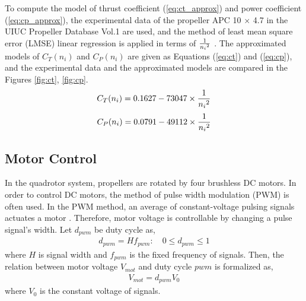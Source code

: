 To compute the model of thrust coefficient (\ref{eq:ct_approx}) and power coefficient (\ref{eq:cp_approx}), the experimental data of the propeller APC 10 \(\times\) 4.7 in the UIUC Propeller Database Vol.1 are used, and the method of least mean square error (LMSE) linear regression is applied in terms of \(1 \over {{n_i}^2}\) \cite{airfoil}. The approximated models of \(C_T (n_i)\) and \(C_P (n_i)\) are given as Equations (\ref{eq:ct}) and (\ref{eq:cp}), and the experimental data and the approximated models are compared in the Figures \ref{fig:ct}, \ref{fig:cp}. \\
\begin{equation}
\label{eq:ct}
\begin{aligned}
C_T ({n_i}) & = 0.1627 -73047 \times {1 \over {n_i}^2} \\
\end{aligned}
\end{equation}
\begin{equation}
\label{eq:cp}
\begin{aligned}
C_P ({n_i}) & = 0.0791 - 49112 \times {1 \over {n_i}^2} \\
\end{aligned}
\end{equation}
\subsection{Motor Control}
In the quadrotor system, propellers are rotated by four brushless DC motors. In order to control DC motors, the method of pulse width modulation (PWM) is often used. In the PWM method, an average of constant-voltage pulsing signals actuates a motor \cite{audio}. Therefore, motor voltage is controllable by changing a pulse signal's width. Let \(d_{pwm}\) be duty cycle as, \\
\begin{equation}
\begin{aligned}
d_{pwm} = H f_{pwm} : \quad 0 \le d_{pwm} \le 1
\end{aligned}
\end{equation}
where \(H\) is signal width and \(f_{pwm}\) is the fixed frequency of signals. Then, the relation between motor voltage \(V_{mot}\) and duty cycle \(pwm\) is formalized as, \\
\begin{equation}
\label{eq:pwm_voltage}
\begin{aligned}
V_{mot} = d_{pwm} V_0
\end{aligned}
\end{equation}
where \(V_0\) is the constant voltage of signals.

